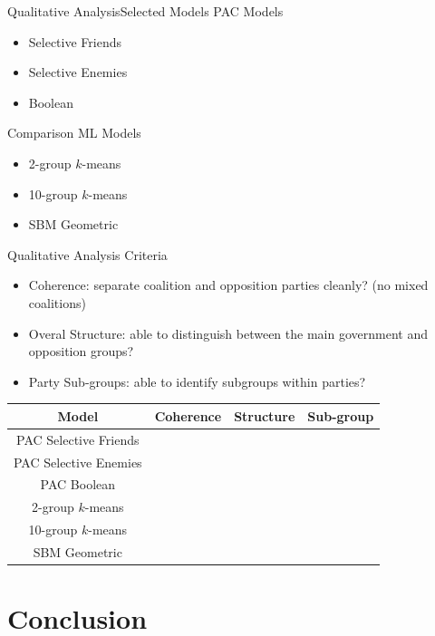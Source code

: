 \documentclass[xcolor=dvipsnames]{beamer}
\newcommand{\cmark}{\ding{51}}
\newcommand{\xmark}{\ding{55}}
\begin{document}
\begin{frame}{Qualitative Analysis}{Selected Models}
  PAC Models
  \begin{itemize}
    \item Selective Friends
    \item Selective Enemies
    \item Boolean
  \end{itemize}
  Comparison ML Models
  \begin{itemize}
    \item 2-group $k$-means
    \item 10-group $k$-means
    \item SBM Geometric
  \end{itemize}
\end{frame}


\begin{frame}{Qualitative Analysis}
  Criteria
  \begin{itemize}
    \item Coherence: separate coalition and opposition parties cleanly? (no mixed coalitions)
    \item Overal Structure: able to distinguish between the main government and opposition groups?
    \item Party Sub-groups: able to identify subgroups within parties?
  \end{itemize}

  \begin{table}[H]
  \centering
  \begin{tabular}{|c|c|c|c|}
  \hline
    Model & Coherence & Structure & Sub-group \\ \hline
  PAC Selective Friends & \cmark & \cmark & \xmark \\
  PAC Selective Enemies & \cmark & \cmark & \xmark \\
  PAC Boolean & \cmark & \cmark & \xmark  \\
  2-group $k$-means & \xmark & \cmark & \xmark \\
  10-group $k$-means & \xmark & \xmark & \xmark \\
  SBM Geometric & \xmark & \xmark & \xmark \\
  \hline
  \end{tabular}
  \end{table}

\end{frame}

\section{Conclusion}
\end{document}
